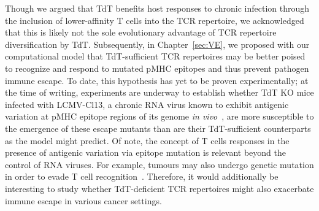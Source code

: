 Though we argued that TdT benefits host responses to chronic infection through the inclusion of lower-affinity T cells into the TCR repertoire, we acknowledged that this is likely not the sole evolutionary advantage of TCR repertoire diversification by TdT. Subsequently, in Chapter~\ref{sec:VE}, we proposed with our computational model that TdT-sufficient TCR repertoires may be better poised to recognize and respond to mutated pMHC epitopes and thus prevent pathogen immune escape. To date, this hypothesis has yet to be proven experimentally; at the time of writing, experiments are underway to establish whether TdT KO mice infected with LCMV-Cl13, a chronic RNA virus known to exhibit antigenic variation at pMHC epitope regions of its genome \textit{in vivo}~\cite{smyth2021characterization}, are more susceptible to the emergence of these escape mutants than are their TdT-sufficient counterparts as the model might predict. Of note, the concept of T cells responses in the presence of antigenic variation via epitope mutation is relevant beyond the control of RNA viruses. For example, tumours may also undergo genetic mutation in order to evade T cell recognition~\cite{dunn2002cancer,finn2018believer,hirschhorn2023t}. Therefore, it would additionally be interesting to study whether TdT-deficient TCR repertoires might also exacerbate immune escape in various cancer settings.

